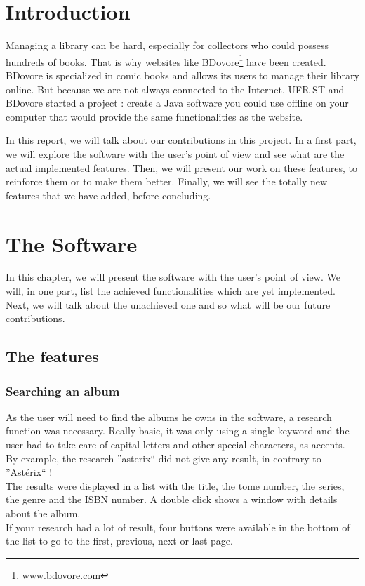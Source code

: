 \documentclass[11pt]{report} %
\begin{document}

\newpage
\tableofcontents
\newpage

\chapter{Introduction}
Managing a library can be hard, especially for collectors who could possess hundreds of books. That is why websites like BDovore\footnote{www.bdovore.com} have been created. BDovore is specialized in comic books and allows its users to manage their library online. But because we are not always connected to the Internet, UFR ST and BDovore started a project : create a Java software you could use offline on your computer that would provide the same functionalities as the website.

In this report, we will talk about our contributions in this project. In a first part, we will explore the software with the user's point of view and see what are the actual implemented features. Then, we will present our work on these features, to reinforce them or to make them better. Finally, we will see the totally new features that we have added, before concluding.

\chapter{The Software}
In this chapter, we will present the software with the user's point of view. We will, in one part, list the achieved functionalities which are yet implemented. Next, we will talk about the unachieved one and so what will be our future contributions.

\section{The features}
\subsection{Searching an album}
As the user will need to find the albums he owns in the software, a research function was necessary. Really basic, it was only using a single keyword and the user had to take care of capital letters and other special characters, as accents. By example, the research ''asterix`` did not give any result, in contrary to ''Astérix`` !\\
The results were displayed in a list with the title, the tome number, the series, the genre and the ISBN number. A double click shows a window with details about the album.\\
If your research had a lot of result, four buttons were available in the bottom of the list to go to the first, previous, next or last page.
\end{document}
